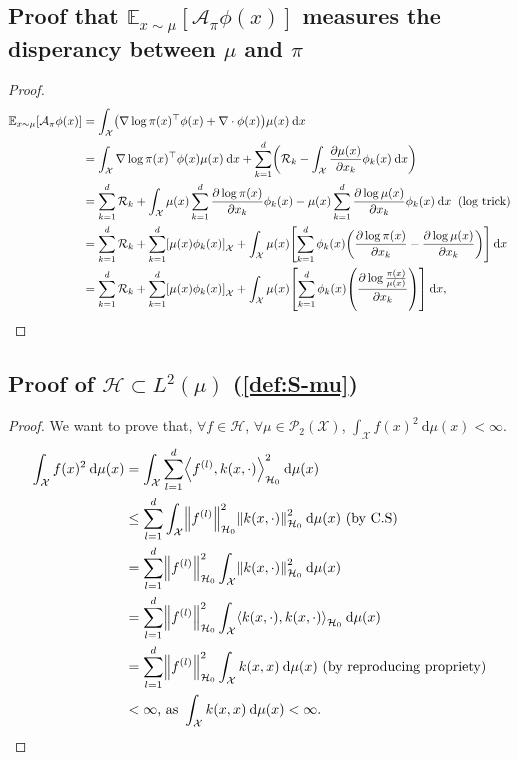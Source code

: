 \documentclass[runningheads,a4paper]{llncs}
\newcommand{\E}{\mathbb{E}}
\newcommand{\X}{\mathcal{X}}
\newcommand{\A}{\mathcal{A}}
\renewcommand{\P}{\mathcal{P}}
\renewcommand{\H}{\mathcal{H}}
\newcommand{\diff}[2]{\frac{\partial #1}{\partial #2}}
\renewcommand{\d}{\: \mathrm{d}}
\DeclarePairedDelimiter{\norm}{\|}{\|}
\DeclarePairedDelimiter{\pare}{(}{)}
\DeclarePairedDelimiter{\sq}{[}{]}
\DeclarePairedDelimiter{\sca}{\langle}{\rangle}
\begin{document}
\subsection{Proof that $\E_{x \sim \mu}[\A_\pi \phi (x)]$ measures the disperancy between $\mu$ and $\pi$}
\begin{proof}\label{proof:Esp_distance}
    \begin{equation*}
  \begin{split}
    \E_{x \sim \mu}[\A_\pi \phi (x)] &=
      \int_\X \pare*{ \nabla \log \pi(x)^\top \phi(x) + \nabla \cdot \phi(x) } \mu(x) \d x \\
    &= \int_\X \nabla \log \pi(x)^\top \phi(x) \mu(x) \d x +
    \sum_{k=1}^d \pare*{ \mathcal{R}_k - \int_\X \diff{\mu(x)}{x_k} \phi_k(x) \d x} \\
    &= \sum_{k=1}^d \mathcal{R}_k +
      \int_\X  \mu(x) \sum_{k=1}^d \diff{\log \pi(x)}{x_k}\phi_k(x) -
    \mu(x) \sum_{k=1}^d \diff{\log \mu(x)}{x_k} \phi_k(x) \d x \;\; \text{(log trick)} \\
    &= \sum_{k=1}^d \mathcal{R}_k +
      \sum_{k=1}^d \sq*{\mu(x) \phi_k(x)}_\X + \int_\X  \mu(x) \sq*{ \sum_{k=1}^d \phi_k(x) \pare*{ \diff{\log \pi(x)}{x_k} - \diff{\log \mu(x)}{x_k}}} \d x \\
    &= \sum_{k=1}^d \mathcal{R}_k +
      \sum_{k=1}^d \sq*{\mu(x) \phi_k(x)}_\X + \int_\X  \mu(x) \sq*{ \sum_{k=1}^d \phi_k(x) \pare*{ \diff{\log \frac{\pi(x)}{\mu(x)}}{x_k}}} \d x,
  \end{split}
\end{equation*}
\end{proof}

\subsection{Proof of $\H \subset L^2(\mu)$ (\ref{def:S-mu})}\label{pro:H-L2}
\begin{proof}
  We want to prove that, $\forall f \in \H$, 
  $\forall \mu \in \P_2(\X)$, $\int_\X f(x)^2 \d \mu(x) < \infty$.
  \begin{align*}
    \int_\X f(x)^2 \d \mu(x) &= \int_\X \sum_{l=1}^d \sca*{ f^{(l)}, k(x, \cdot) }^2_{\H_0} \d \mu(x) \\
    &\leq \sum_{l=1}^d \int_\X \norm*{f^{(l)}}^2_{\H_0} \norm*{k(x, \cdot)}^2_{\H_0} \d \mu(x)
      \text{ (by C.S)} \\
    &= \sum_{l=1}^d \norm*{f^{(l)}}^2_{\H_0} \int_\X \norm*{k(x, \cdot)}^2_{\H_0} \d \mu(x) \\
    &= \sum_{l=1}^d \norm*{f^{(l)}}^2_{\H_0} \int_\X \sca*{k(x, \cdot), k(x, \cdot)}_{\H_0} \d \mu(x) \\
    &= \sum_{l=1}^d \norm*{f^{(l)}}^2_{\H_0} \int_\X k(x, x) \d \mu(x)
      \text{ (by reproducing propriety)} \\
    &< \infty \text{, as } \int_\X k(x, x) \d \mu(x) < \infty.
  \end{align*}
\end{proof}
\end{document}
